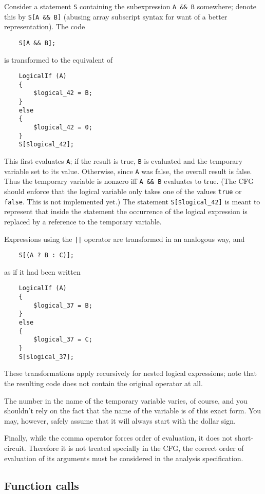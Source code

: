 Consider a statement \lstinline|S| containing the subexpression
\lstinline|A && B| somewhere; denote this by \lstinline|S[A && B]|
(abusing array subscript syntax for want of a better
representation). The code
\begin{lstlisting}
    S[A && B];
\end{lstlisting}
is transformed to the equivalent of
\begin{lstlisting}
    LogicalIf (A)
    {
        $logical_42 = B;
    }
    else
    {
        $logical_42 = 0;
    }
    S[$logical_42];
\end{lstlisting}
This first evaluates \lstinline|A|; if the result is true,
\lstinline|B| is evaluated and the temporary variable set to its
value. Otherwise, since \lstinline|A| was false, the overall result
is false. Thus the temporary variable is nonzero iff \lstinline|A && B|
evaluates to true. (The CFG should enforce that the logical
variable only takes one of the values \lstinline|true| or
\lstinline|false|. This is not implemented yet.) The statement
\lstinline|S[$logical_42]| %
is meant to represent that inside the statement the occurrence of
the logical expression is replaced by a reference to the temporary
variable.

Expressions using the \lstinline&||& operator are transformed in an
analogous way, and
\begin{lstlisting}
    S[(A ? B : C)];
\end{lstlisting}
as if it had been written
\begin{lstlisting}
    LogicalIf (A)
    {
        $logical_37 = B;
    }
    else
    {
        $logical_37 = C;
    }
    S[$logical_37];
\end{lstlisting}

These transformations apply recursively for nested logical
expressions; note that the resulting code does not contain the
original operator at all.

The number in the name of the temporary variable varies, of course,
and you shouldn't rely on the fact that the name of the variable is
of this exact form. You may, however, safely assume that it will
always start with the dollar sign.

Finally, while the comma operator forces order of evaluation, it
does not short-circuit. Therefore it is not treated specially in the
CFG, the correct order of evaluation of its arguments must be
considered in the analysis specification.

\subsection{Function calls}

